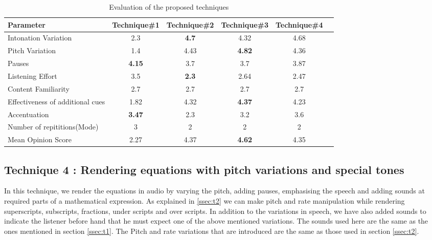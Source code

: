 \documentclass{article}
\begin{document}
\begin{table}[t]
\centering
\caption{Evaluation of the proposed techniques}

\vspace{8pt} %

\begin{tabularx}{\textwidth}{|l |c |c |c |c|l|}
\hline%
Parameter   & Technique\#1 & Technique\#2 & Technique\#3 & Technique\#4 \\[1.5ex]
\hline
Intonation Variation  & 2.3 & \textbf{4.7} & 4.32 & 4.68 \\
\hline
Pitch  Variation & 1.4 & 4.43 & \textbf{4.82} & 4.36\\
\hline
Pauses  & \textbf{4.15} & 3.7 & 3.7 & 3.87 \\
\hline
Listening Effort  & 3.5 & \textbf{2.3} & 2.64 & 2.47\\
\hline
Content Familiarity  &2.7 &2.7 &2.7 &2.7\\
\hline
Effectiveness of additional cues  &1.82 & 4.32 & \textbf{4.37} & 4.23\\
\hline
Accentuation &\textbf{3.47} & 2.3 & 3.2 & 3.6 \\
\hline
Number of repititions(Mode) & 3 & 2 & 2 & 2\\
\hline
Mean Opinion Score  & 2.27 & 4.37 & \textbf{4.62} & 4.35\\ %
\hline


\end{tabularx}
\label{table:eval}
\end{table}



\subsection{Technique 4 : Rendering equations with pitch variations and special tones}
\label{ssec:t4}


In this technique, we render the equations in audio by varying the pitch, adding pauses, emphasising the speech and adding sounds at required parts of a mathematical expression. As explained in \ref{ssec:t2} we can make pitch and rate manipulation while rendering superscripts, subscripts, fractions, under scripts and over scripts. In addition to the variations in speech, we have also added sounds to indicate the listener before hand that he must expect one of the above mentioned variations. The sounds used here are the same as the ones mentioned in section \ref{ssec:t1}.
The Pitch and rate variations that are introduced are the same as those used in section \ref{ssec:t2}.
\end{document}
